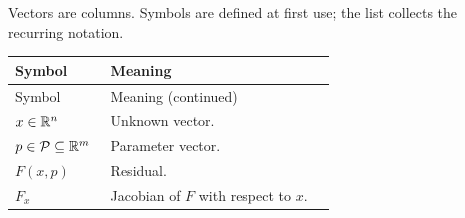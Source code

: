\frontchapter{\symbolsname}
Vectors are columns. Symbols are defined at first use; the list collects the
recurring notation.
\begin{longtable}{@{}p{0.28\linewidth}p{0.66\linewidth}@{}}
    \toprule Symbol                 & Meaning                                  \\\midrule
    \endfirsthead
    \toprule Symbol                 & Meaning (continued)                      \\\midrule
    \endhead
    \bottomrule\endfoot
    \(x\in\mathbb{R}^n\)                    & Unknown vector.                          \\
    \(p\in\mathcal P\subseteq\mathbb{R}^m\) & Parameter vector.                        \\
    \(F(x,p)\)                      & Residual.                                \\
    \(F_x\)                         & Jacobian of \(F\) with respect to \(x\). \\
\end{longtable}
